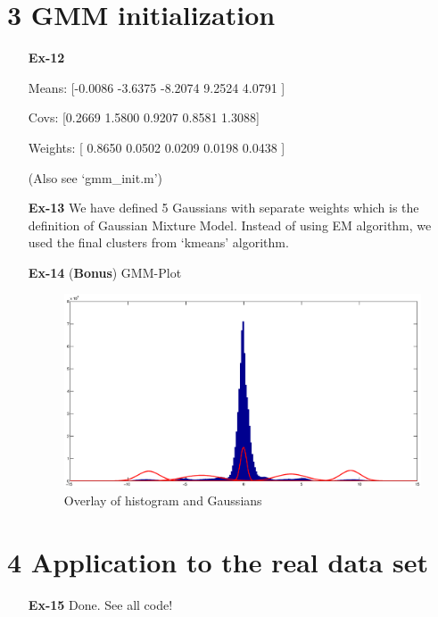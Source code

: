 \documentclass[a4paper]{article}
\begin{document}
\section*{3 GMM initialization}
\begin{enumerate}
	\item[\textbf{Ex-12}]
	
	Means: [-0.0086	-3.6375	-8.2074 9.2524 4.0791 ]
	
	Covs:  [0.2669 1.5800 0.9207 0.8581 1.3088]
	
	Weights: [ 0.8650	0.0502	0.0209	0.0198	0.0438 ]
	
	(Also see `gmm\_init.m')
	
	\item[\textbf{Ex-13}] We have defined 5 Gaussians with separate weights which is the definition of Gaussian Mixture Model. Instead of using EM algorithm, we used the final clusters from  `kmeans' algorithm.
	\item[\textbf{Ex-14}](\textbf{Bonus}) GMM-Plot
	\begin{figure}[H]
		\begin{center}
			\includegraphics[width=1.1\textwidth]{gmm_hist.eps}
			\caption{Overlay of histogram and Gaussians}\label{fig:gmmhist}
		\end{center}
	\end{figure}	
\end{enumerate}


\section*{4 Application to the real data set}
\begin{enumerate}
	\item[\textbf{Ex-15}] Done. See all code!
\end{enumerate}
\end{document}
